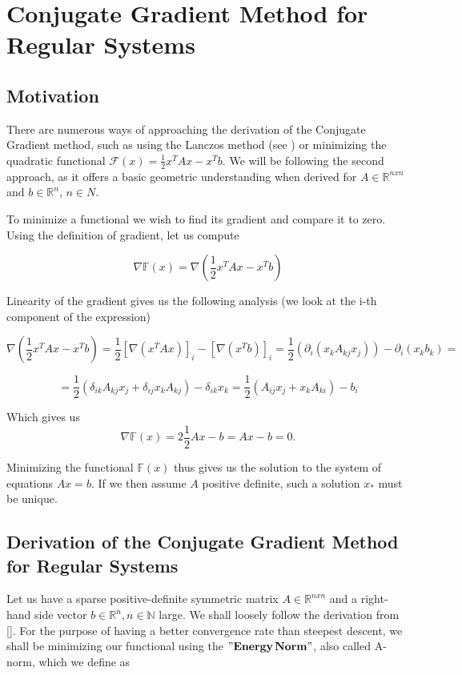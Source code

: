 \chapter{Conjugate Gradient Method for Regular Systems}

\section{Motivation}

There are numerous ways of approaching the derivation of the Conjugate Gradient method, such as using the Lanczos method (see \cite{vanderVorst03}) or minimizing the quadratic functional \(\mathcal{F}(x)=\frac{1}{2}x^{T}Ax - x^{T}b\). We will be following the second approach, as it offers a basic geometric understanding when derived for \(A\in{\mathbb{R}^{nxn}}\) and \(b\in\mathbb{R}^n\), \(n\in{N}\). 

\indent To minimize a functional we wish to find its gradient and compare it to zero. Using the definition of gradient, let us compute 

\[\nabla{\mathbb{F}(x)} = \nabla{(\frac{1}{2}x^{T}Ax - x^{T}b)}\]

Linearity of the gradient gives us the following analysis (we look at the i-th component of the expression) 

\[\nabla{(\frac{1}{2}x^{T}Ax - x^{T}b)}=\frac{1}{2}[\nabla{(x^TAx)}]_{i} - [\nabla{(x^Tb)}]_i = \frac{1}{2}(\partial_i(x_kA_{kj}x_j)) - \partial_i(x_kb_k) =\]

\[= \frac{1}{2}(\delta_{ik}A_{kj}x_j + \delta_{ij}x_kA_{kj}) -\delta_{ik}x_k = \frac{1}{2}(A_{ij}x_j + x_kA_{ki}) - b_i \]


Which gives us 
\begin{equation}\label{1.1}
    \nabla\mathbb{F}(x)=2\frac{1}{2}Ax - b = Ax - b = 0.
\end{equation}

Minimizing the functional \(\mathbb{F}(x)\) thus gives us the solution to the system of equations \(Ax = b\). If we then assume \(A\) positive definite, such a solution \(x_*\) must be unique.


\section{Derivation of the Conjugate Gradient Method for Regular Systems}


Let us have a sparse positive-definite symmetric matrix \(A\in\mathbb{R}^{nxn} \) and a right-hand side vector \(b\in\mathbb{R}^n, n\in\mathbb{N} \) large. We  shall loosely follow the derivation from [\cite{Hnetykova12}]. For the purpose of having a better convergence rate than steepest descent, we shall be minimizing our functional using the \(\bold{"Energy\,Norm"}\), also called A-norm, which we define as 

